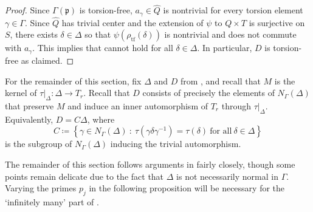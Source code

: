 \documentclass[11pt]{article}
\theoremstyle{plain}
\theoremstyle{definition}
\theoremstyle{remark}
\newcommand{\frakp}{\mathfrak{p}}
\newcommand{\gam}{\gamma}
\newcommand{\Gam}{\Gamma}
\newcommand{\de}{\delta}
\newcommand{\Del}{\Delta}
\newcommand{\wh}{\widehat}
\newenvironment{pf}{\begin{proof}}{\end{proof}}
\begin{document}
\begin{pf}
Since $\Gam(\frakp)$ is torsion-free, $a_\gam \in \wh{Q}$ is nontrivial for every torsion element $\gam \in \Gam$. Since $\wh{Q}$ has trivial center and the extension of $\psi$ to $Q \times T$ is surjective on $S$, there exists $\de \in \Del$ so that $\psi(\rho_{\mathrm{tf}}(\de))$ is nontrivial and does not commute with $a_\gam$. This implies that  cannot hold for all $\de \in \Del$. In particular, $D$ is torsion-free as claimed.
\end{pf}

For the remainder of this section, fix $\Del$ and $D$ from , and recall that $M$ is the kernel of $\tau|_\Del : \Del \to T_r$. Recall that $D$ consists of precisely the elements of $N_\Gam(\Del)$ that preserve $M$ and induce an inner automorphism of $T_r$ through $\tau|_\Del$. Equivalently, $D = C \Del$, where
\begin{equation}\label{eq:CDef}
C \coloneqq\!\left\{\gam \in N_\Gam(\Del)\ :\ \tau(\gam \de \gam^{-1}) = \tau (\de)\ \textrm{for all}\ \de \in \Del \right\}
\end{equation}
is the subgroup of $N_\Gam(\Del)$ inducing the trivial automorphism.

The remainder of this section follows arguments in \cite[\S 4]{BelolipetskyLubotzky} fairly closely, though some points remain delicate due to the fact that $\Del$ is not necessarily normal in $\Gam$. Varying the primes $p_j$ in the following proposition will be necessary for the `infinitely many' part of .
\end{document}
